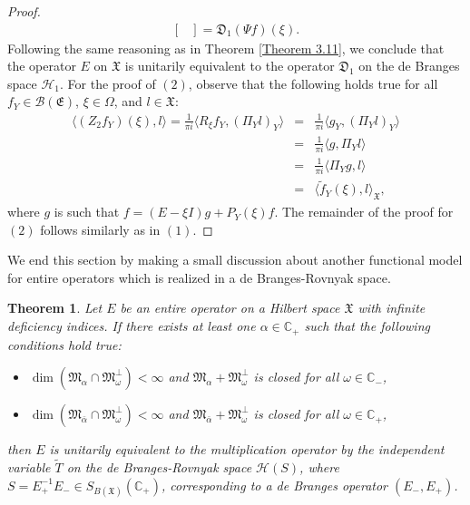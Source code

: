 \documentclass [12pt,reqno]{amsart}
\numberwithin{equation}{subsection}
\newtheorem{thm}{Theorem}[section]
\numberwithin{equation}{section}
\begin{document}
\begin{proof}
\begin{eqnarray*}
\begin{bmatrix}
                	\end{bmatrix}=  \mathfrak{D}_1                                 (\Psi f)(\xi).	                	
\end{eqnarray*}
Following the same reasoning as in Theorem \ref{Theorem 3.11}, we conclude that the operator \( E \) on \( \mathfrak{X} \) is unitarily equivalent to the operator \( \mathfrak{D}_1 \) on the de Branges space \( \mathcal{H}_1 \). For the proof of $(2)$, observe that the following holds true for all \( f_Y \in \mathcal{B}(\mathfrak{E}) \), \( \xi \in \Omega \), and \( l \in \mathfrak{X} \): 
\begin{eqnarray*}
\langle (Z_2 f_Y)(\xi), l \rangle = \frac{1}{\pi i}\langle R_{\xi} f_Y, (\Pi_Yl)_Y \rangle 
&=&\frac{1}{\pi i}\langle g_Y, (\Pi_{Y}l)_Y \rangle\\
&=&\frac{1}{\pi i} \langle g, \Pi_{Y}l \rangle\\
&=& \frac{1}{\pi i}\langle \Pi_{Y}g, l \rangle\\
 &=& \langle \tilde{f}_Y(\xi), l \rangle_{\mathfrak{X}},  
\end{eqnarray*} 
where $g$ is such that $f = (E - \xi I)g + P_Y(\xi)f$. The remainder of the proof for $(2)$ follows similarly as in $(1)$.
\end{proof}

We end this section by making a small discussion about another functional model for entire operators which is realized in a de Branges-Rovnyak space.

\begin{thm}
Let $E$ be an entire operator on a Hilbert space $\mathfrak{X}$ with infinite deficiency indices. If there exists at least one \(\alpha \in \mathbb{C}_+\) such that the following conditions hold true:
\begin{itemize}
\item[i)] \(\dim(\mathfrak{M}_{\alpha} \cap \mathfrak{M}_{\omega}^{\perp}) < \infty\) and $\mathfrak{M}_{\alpha} + \mathfrak{M}_{\omega}^{\perp}$ is closed for all \(\omega \in   \mathbb{C}_-\),
\item[ii)] \(\dim(\mathfrak{M}_{\bar{\alpha}} \cap \mathfrak{M}_{\omega}^{\perp}) < \infty\) and $\mathfrak{M}_{\bar{\alpha}} + \mathfrak{M}_{\omega}^{\perp}$ is closed for all \(\omega \in  \mathbb{C}_+\),
\end{itemize}then $E$ is unitarily equivalent to the multiplication operator by the independent variable $\tilde{T}$ on the de Branges-Rovnyak space $\mathcal{H}(S)$, where $S=E_+^{-1}E_- \in S_{B(\mathfrak{X})}(\mathbb{C}_+) $, corresponding to a de Branges operator $(E_- ,E_+)$.
\end{thm}
\end{document}
